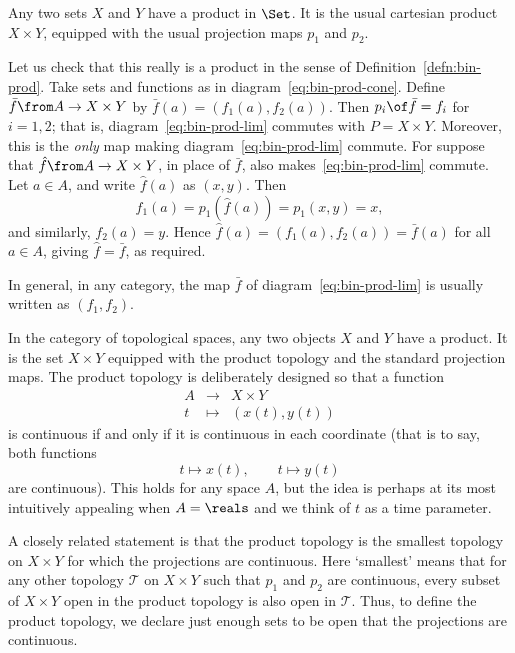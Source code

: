 \begin{example}
\label{eg:sets}
Any two sets $X$ and $Y$ have a product%
%
%
in $\Set$.  It is the usual cartesian product $X \times Y$, equipped with
the usual projection maps $p_1$ and $p_2$.

Let us check that this really is a product in the sense of
Definition~\ref{defn:bin-prod}.  Take sets and functions as in
diagram~\eqref{eq:bin-prod-cone}.  Define $\bar{f}\from A \to X \times Y$
by $\bar{f}(a) = (f_1(a), f_2(a))$.  Then $p_i \of \bar{f} = f_i$ for $i =
1, 2$; that is, diagram~\eqref{eq:bin-prod-lim} commutes with $P = X \times
Y$.  Moreover, this is the \emph{only} map making
diagram~\eqref{eq:bin-prod-lim} commute.  For suppose that $\hat{f}\from A
\to X \times Y$, in place of $\bar{f}$, also makes~\eqref{eq:bin-prod-lim}
commute.  Let $a \in A$, and write $\hat{f}(a)$ as $(x, y)$.  Then
\[
f_1(a) = p_1(\hat{f}(a)) = p_1(x, y) = x,
\]
and similarly, $f_2(a) = y$.  Hence $\hat{f}(a) = (f_1(a), f_2(a)) =
\bar{f}(a)$ for all $a \in A$, giving $\hat{f} = \bar{f}$, as required.
\end{example}

In general, in any category, the map $\bar{f}$ of
diagram~\eqref{eq:bin-prod-lim} is usually written as $(f_1, f_2)$.

\begin{example}
\label{eg:prod-spaces}
In the category of topological spaces, any two objects $X$ and $Y$ have a
product.%
%
%
It is the set $X \times Y$ equipped with the product topology and the
standard projection maps.  The product topology is deliberately designed so
that a function
\[
\begin{array}{ccc}
A       &\to            &X \times Y     \\
t       &\mapsto        &(x(t), y(t))
\end{array}
\]
is continuous if and only if it is continuous in each coordinate (that is to
say, both functions
\[
t \mapsto x(t),
\qquad
t \mapsto y(t)
\]
are continuous).  This holds for any space $A$, but the idea is perhaps at
its most intuitively appealing when $A = \reals$ and we think of $t$ as a
time parameter.

A closely related statement is that the product topology is the smallest
topology on $X \times Y$ for which the projections are continuous.  Here
`smallest' means that for any other topology $\mathscr{T}$ on $X \times Y$
such that $p_1$ and $p_2$ are continuous, every subset of $X \times Y$ open
in the product topology is also open in $\mathscr{T}$.  Thus, to define the
product topology, we declare just enough sets to be open that the
projections are continuous.
\end{example}

